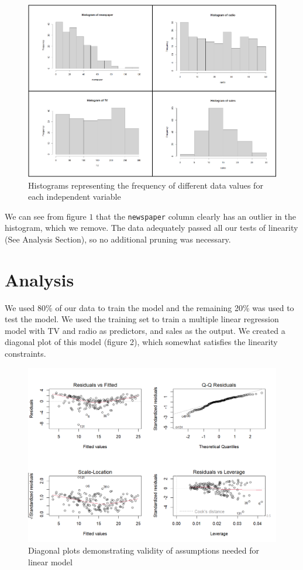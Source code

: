 \documentclass{article}
\begin{document}
\begin{figure}[h]
    \centering
    \includegraphics[width=1\linewidth]{histogram.png}
    \caption{Histograms representing the frequency of different data values for each independent variable}
    \label{fig:enter-label}
\end{figure}

We can see from figure $1$ that the \texttt{newspaper} column clearly has an outlier in the histogram, which we remove.  The data adequately passed all our tests of linearity (See Analysis Section), so no additional pruning was necessary.

\section{Analysis}

We used 80\% of our  data to train the model and the remaining 20\% was used to test the model.  We used the training set to train a multiple linear regression model with TV and radio as predictors, and sales as the output.  We created a diagonal plot of this model (figure 2), which somewhat satisfies the linearity constraints.

\begin{figure}[h]
    \centering
    \includegraphics[width=0.9\linewidth]{diagonal.png}
    \caption{Diagonal plots demonstrating validity of assumptions needed for linear model}
    \label{fig:enter-label}
\end{figure}
\end{document}
